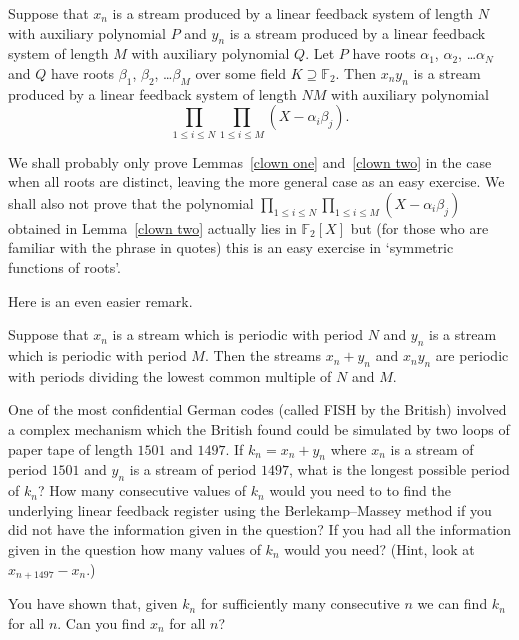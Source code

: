 \begin{lemma}\label{clown two}
Suppose that $x_{n}$ is a stream
produced by a linear feedback system of length $N$
with auxiliary
polynomial $P$ and $y_{n}$  is a stream
produced by a linear feedback system of length $M$
with auxiliary polynomial $Q$.
Let  $P$ have roots $\alpha_{1}$, $\alpha_{2}$,
\dots $\alpha_{N}$ and $Q$ have roots
$\beta_{1}$, $\beta_{2}$,
\dots $\beta_{M}$ over some field $K\supseteq {\mathbb F}_{2}$.
Then $x_{n}y_{n}$ is a stream produced by
a linear feedback system of length $NM$
with auxiliary polynomial
\[\prod_{1\leq i\leq N}\prod_{1\leq i\leq M}(X-\alpha_{i}\beta_{j}).\]
\end{lemma}
\noindent
We shall probably only prove Lemmas~\ref{clown one}
and~\ref{clown two} in the case when all roots are
distinct, leaving the more general case as an
easy exercise. We shall also not prove that
the polynomial
$\prod_{1\leq i\leq N}\prod_{1\leq i\leq M}(X-\alpha_{i}\beta_{j})$
obtained in Lemma~\ref{clown two}
actually lies in ${\mathbb F}_{2}[X]$ but (for those who
are familiar with the phrase in quotes)
this is an easy exercise
in `symmetric functions of roots'.

Here is an even easier remark.
\begin{lemma}\label{clown three}
Suppose that $x_{n}$ is a stream
which is periodic with period $N$
and $y_{n}$ is a stream which is periodic
with period $M$. Then the streams
$x_{n}+y_{n}$ and $x_{n}y_{n}$
are periodic with periods dividing
the lowest common multiple of $N$ and $M$.
\end{lemma}
\begin{exercise}\label{Fish}
One of the most confidential
German codes (called FISH by the British)
involved a complex mechanism which
the British found could be simulated
by two loops of paper tape of
length $1501$ and $1497$. If $k_{n}=x_{n}+y_{n}$
where $x_{n}$ is a stream of period $1501$
and $y_{n}$ is a stream of period $1497$,
what is the longest possible period of $k_{n}$?
How many consecutive values of $k_{n}$ would you
need to to find the underlying linear feedback register
using the Berlekamp--Massey method if you did
not have the information given in the question? 
If you had
all the information given in the question
how many values of $k_{n}$ would you need?
(Hint, look at $x_{n+1497}-x_{n}$.)

You have shown that, given $k_{n}$ for sufficiently
many consecutive $n$ we can find $k_{n}$ for all $n$.
Can you find $x_{n}$ for all $n$? 
\end{exercise}

